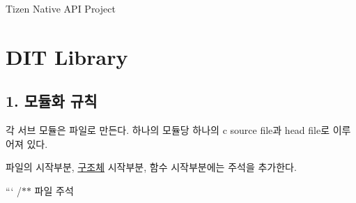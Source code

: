 Tizen Native A\-P\-I Project

\section*{D\-I\-T Library}

\subsection*{1. 모듈화 규칙}


\begin{DoxyItemize}
\item 각 서브 모듈은 파일로 만든다. 하나의 모듈당 하나의 c source file과 head file로 이루어져 있다.
\item 파일의 시작부분, \hyperlink{struct_xEA_xB5_xAC_xEC_xA1_xB0_xEC_xB2_xB4}{구조체} 시작부분, 함수 시작부분에는 주석을 추가한다.
\end{DoxyItemize}

``` /$\ast$$\ast$ 파일 주석 